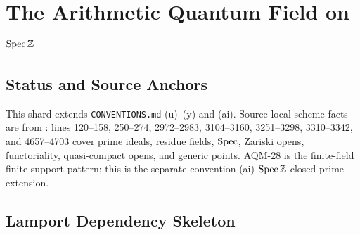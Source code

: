 
\section[The Arithmetic Quantum Field on Spec Z]{The Arithmetic Quantum Field on \(\operatorname{Spec}\mathbb Z\)}
\label{sec:spec-z-arithmetic-quantum-field}
\subsection{Status and Source Anchors}

This shard extends \texttt{CONVENTIONS.md} (u)--(y) and (ai).  Source-local
scheme facts are from : lines
120--158, 250--274, 2972--2983, 3104--3160, 3251--3298, 3310--3342, and
4657--4703 cover prime ideals, residue fields, \(\operatorname{Spec}\), Zariski opens,
functoriality, quasi-compact opens, and generic points.  AQM-28 is the
finite-field finite-support pattern; this is the separate convention (ai)
\(\operatorname{Spec}\mathbb Z\) closed-prime extension.
\subsection{Lamport Dependency Skeleton}

